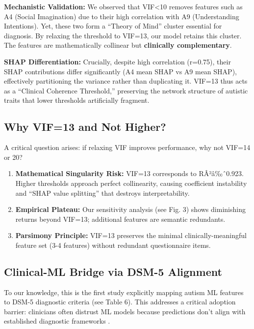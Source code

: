 \textbf{Mechanistic Validation:} We observed that VIF\textless10 removes features such as A4 (Social Imagination) due to their high correlation with A9 (Understanding Intentions). Yet, these two form a ``Theory of Mind'' cluster essential for diagnosis. By relaxing the threshold to VIF=13, our model retains this cluster. The features are mathematically collinear but \textbf{clinically complementary}.

\textbf{SHAP Differentiation:} Crucially, despite high correlation (r=0.75), their SHAP contributions differ significantly (A4 mean \textbar SHAP vs A9 mean \textbar SHAP), effectively partitioning the variance rather than duplicating it. VIF=13 thus acts as a ``Clinical Coherence Threshold,'' preserving the network structure of autistic traits that lower thresholds artificially fragment.

\subsection{Why VIF=13 and Not Higher?}\label{why-vif13-and-not-higher}

A critical question arises: if relaxing VIF improves performance, why not VIF=14 or 20?

\begin{enumerate}
\def\labelenumi{\arabic{enumi}.}
\item
  \textbf{Mathematical Singularity Risk:} VIF=13 corresponds to RÂ²â‰ˆ0.923. Higher thresholds approach perfect collinearity, causing coefficient instability and ``SHAP value splitting'' that destroys interpretability.
\item
  \textbf{Empirical Plateau:} Our sensitivity analysis (see Fig. 3) shows diminishing returns beyond VIF=13; additional features are semantic redundants.
\item
  \textbf{Parsimony Principle:} VIF=13 preserves the minimal clinically-meaningful feature set (3-4 features) without redundant questionnaire items.
\end{enumerate}

\subsection{Clinical-ML Bridge via DSM-5 Alignment}\label{clinical-ml-bridge-via-dsm-5-alignment}

To our knowledge, this is the first study explicitly mapping autism ML features to DSM-5 diagnostic criteria (see Table 6). This addresses a critical adoption barrier: clinicians often distrust ML models because predictions don't align with established diagnostic frameworks \cite{ref16}.

